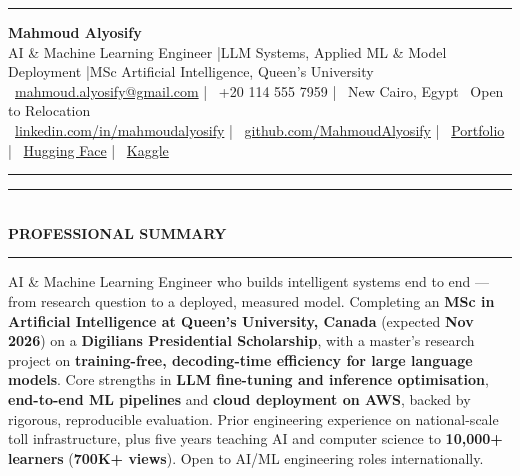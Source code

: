 \documentclass[10pt, a4paper]{article}
\newcommand{\faEnvelope}{}\newcommand{\faPhone}{}\newcommand{\faMapMarker}{}%
\newcommand{\faLinkedin}{}\newcommand{\faGithub}{}\newcommand{\faRobot}{}%
\newcommand{\faChartBar}{}\newcommand{\faGlobe}{}%
\newcommand{\cvsection}[1]{%
  \vspace{3pt}%
  {\color{navy}\rule{\linewidth}{1.1pt}}\\[0.5pt]%
  {\color{navy}\bfseries\fontsize{9.5}{11}\selectfont\uppercase{#1}}\\[-4pt]%
  {\color{teal}\rule{\linewidth}{0.6pt}}%
  \vspace{2pt}%
}
\begin{document}
\small

{\color{navy}\rule{\linewidth}{1.5pt}}

\vspace{3pt}
\begin{center}
  {\fontsize{21}{24}\bfseries\color{navy} Mahmoud Alyosify}\\[3pt]
  {\fontsize{10}{12}\color{teal}
    AI \& Machine Learning Engineer \enspace|\enspace LLM Systems, Applied ML \& Model Deployment
    \enspace|\enspace MSc Artificial Intelligence, Queen's University
}\\[4pt]
  {\color{midgray}
    \faEnvelope\ \href{mailto:mahmoud.alyosify@gmail.com}{mahmoud.alyosify@gmail.com}
    \enspace|\enspace
    \faPhone\ +20 114 555 7959
    \enspace|\enspace
    \faMapMarker\ New Cairo, Egypt \textperiodcentered\ Open to Relocation}\\[2pt]
  {\faLinkedin\ \href{https://linkedin.com/in/mahmoudalyosify}{linkedin.com/in/mahmoudalyosify}
    \enspace|\enspace
    \faGithub\ \href{https://github.com/MahmoudAlyosify}{github.com/MahmoudAlyosify}
    \enspace|\enspace
    \faGlobe\ \href{https://mahmoudalyosifysite.github.io/}{Portfolio}
    \enspace|\enspace
    \faRobot\ \href{https://huggingface.co/mahmoudalyosify}{Hugging Face}
    \enspace|\enspace
    \faChartBar\ \href{https://kaggle.com/mahmoudalyosify}{Kaggle}}
\end{center}

{\color{navy}\rule{\linewidth}{1.5pt}}

\vspace{2pt}

\cvsection{Professional Summary}

{\color{darkgray}\justifying
AI \& Machine Learning Engineer who builds intelligent systems end to end --- from research question to a deployed, measured model. Completing an \textbf{MSc in Artificial Intelligence at Queen's University, Canada} (expected \textbf{Nov 2026}) on a \textbf{Digilians Presidential Scholarship}, with a master's research project on \textbf{training-free, decoding-time efficiency for large language models}. Core strengths in \textbf{LLM fine-tuning and inference optimisation}, \textbf{end-to-end ML pipelines} and \textbf{cloud deployment on AWS}, backed by rigorous, reproducible evaluation. Prior engineering experience on national-scale toll infrastructure, plus five years teaching AI and computer science to \textbf{10,000+ learners} (\textbf{700K+ views}). Open to AI/ML engineering roles internationally.}
\end{document}

